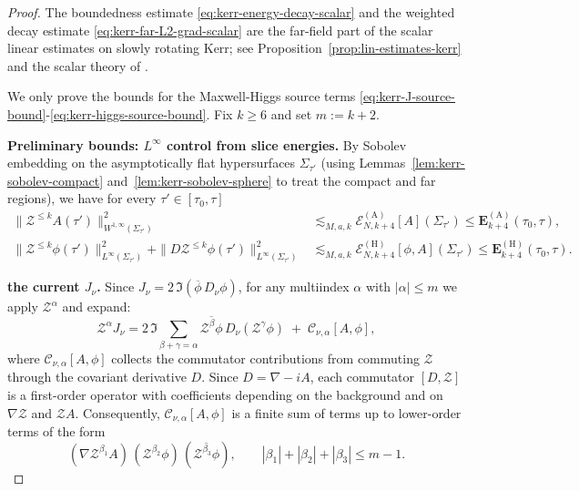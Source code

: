 \documentclass[11pt]{article}
\numberwithin{equation}{section}
\theoremstyle{plain}
\theoremstyle{definition}
\theoremstyle{remark}
\begin{document}
\begin{proof}
The boundedness estimate \eqref{eq:kerr-energy-decay-scalar} and the weighted decay estimate \eqref{eq:kerr-far-L2-grad-scalar} are the far-field part of the scalar linear estimates on slowly rotating Kerr; see Proposition~\ref{prop:lin-estimates-kerr} and the scalar theory of \cite[Theorems~3.1 and~3.2]{DRSRKerrIII}.

We only prove the bounds for the Maxwell-Higgs source terms \eqref{eq:kerr-J-source-bound}-\eqref{eq:kerr-higgs-source-bound}.
Fix $k\ge 6$ and set $m:=k+2$.

\smallskip\noindent
\textbf{Preliminary bounds: $L^\infty$ control from slice energies.}
By Sobolev embedding on the asymptotically flat hypersurfaces $\Sigma_{\tau'}$ (using Lemmas~\ref{lem:kerr-sobolev-compact} and~\ref{lem:kerr-sobolev-sphere} to treat the compact and far regions), we have for every $\tau'\in[\tau_0,\tau]$
\begin{eqnarray}
\|\mathcal Z^{\le k}A(\tau')\|_{W^{1,\infty}(\Sigma_{\tau'})}^{2}
&\lesssim_{M,a,k} \mathcal E_{N,k+4}^{(\mathrm A)}[A](\Sigma_{\tau'})
\le \mathbf E_{k+4}^{(\mathrm A)}(\tau_0,\tau),
\label{eq:sobolev-A}\\
\|\mathcal Z^{\le k}\phi(\tau')\|_{L^{\infty}(\Sigma_{\tau'})}^{2}
+\|D\mathcal Z^{\le k}\phi(\tau')\|_{L^{\infty}(\Sigma_{\tau'})}^{2}
&\lesssim_{M,a,k} \mathcal E_{N,k+4}^{(\mathrm H)}[\phi,A](\Sigma_{\tau'})
\le \mathbf E_{k+4}^{(\mathrm H)}(\tau_0,\tau).
\label{eq:sobolev-phi}
\end{eqnarray}

\smallskip\noindent
\textbf{the current $J_\nu$.}
Since $J_\nu=2\,\Im(\overline\phi\,D_\nu\phi)$, for any multiindex $\alpha$ with $|\alpha|\le m$ we apply $\mathcal Z^\alpha$ and expand:
\begin{equation}\label{eq:ZJ-expand}
\mathcal Z^\alpha J_\nu
=
2\,\Im\!\!\sum_{\beta+\gamma=\alpha}
\overline{\mathcal Z^\beta\phi}\,D_\nu(\mathcal Z^\gamma\phi)
\;+\;
\mathcal C_{\nu,\alpha}[A,\phi],
\end{equation}
where $\mathcal C_{\nu,\alpha}[A,\phi]$ collects the commutator contributions from commuting $\mathcal Z$ through the covariant derivative $D$.
Since $D=\nabla-iA$, each commutator $[D,\mathcal Z]$ is a first-order operator with coefficients depending on the background and on $\nabla\mathcal Z$ and $\mathcal Z A$.
Consequently, $\mathcal C_{\nu,\alpha}[A,\phi]$ is a finite sum of terms up to lower-order terms of the form
\begin{equation}\label{eq:commJ-structure}
(\nabla\mathcal Z^{\beta_1}A)\,(\mathcal Z^{\beta_2}\phi)\,(\overline{\mathcal Z^{\beta_3}\phi}),
\qquad |\beta_1|+|\beta_2|+|\beta_3|\le m-1.
\end{equation}


\end{proof}
\end{document}
